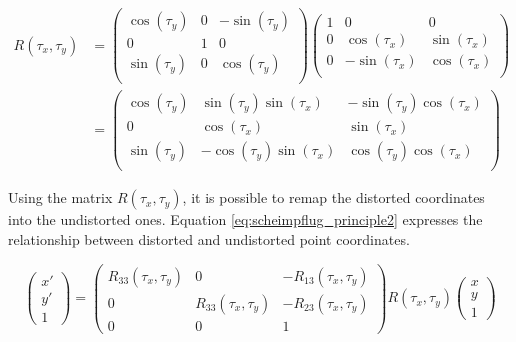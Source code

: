 \begin{equation} 
  \label{eq:scheimpflug_principle1}
  \begin{split}
    R(\tau_x, \tau_y) 
    &= 
    \begin{pmatrix}
      \cos(\tau_y) & 0 & -\sin(\tau_y) \\ 
      0 & 1 & 0 \\ 
      \sin(\tau_y) & 0 & \cos(\tau_y) \\ 
    \end{pmatrix}
    \begin{pmatrix}
      1 & 0 & 0 \\ 
      0 & \cos(\tau_x) & \sin(\tau_x) \\ 
      0 & -\sin(\tau_x) & \cos(\tau_x) \\ 
    \end{pmatrix} \\[0.5cm] 
    &=
    \begin{pmatrix}
      \cos(\tau_y) & \sin(\tau_y)\sin(\tau_x) & -\sin(\tau_y)\cos(\tau_x) \\ 
      0 & \cos(\tau_x) & \sin(\tau_x) \\ 
      \sin(\tau_y) & -\cos(\tau_y)\sin(\tau_x) & \cos(\tau_y)\cos(\tau_x) \\ 
    \end{pmatrix}
  \end{split}
\end{equation}

Using the matrix $R(\tau_x, \tau_y)$, it is possible to remap the distorted coordinates into the undistorted ones. Equation \ref{eq:scheimpflug_principle2} expresses the relationship between distorted and undistorted point coordinates.

\begin{equation} 
  \label{eq:scheimpflug_principle2}
  \begin{pmatrix}
    x' \\ 
    y' \\ 
    1
    \end{pmatrix}
  =
  \begin{pmatrix}
  R_{33}(\tau_x, \tau_y) & 0 & -R_{13}(\tau_x, \tau_y) \\ 
  0 & R_{33}(\tau_x, \tau_y) & -R_{23}(\tau_x, \tau_y) \\ 
  0 & 0 & 1 
  \end{pmatrix}
  R(\tau_x, \tau_y)
  \begin{pmatrix}
    x \\ 
    y \\ 
    1
    \end{pmatrix}
\end{equation}

